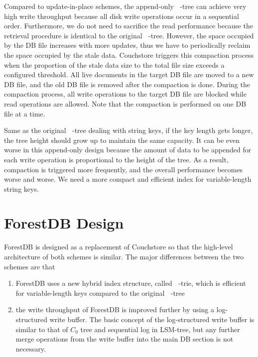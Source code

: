 \documentclass[11pt]{article}
\DeclareMathOperator{\HBP}{\text{HB}^+}
\DeclareMathOperator{\BP}{\text{B}^+}
\begin{document}
Compared to update-in-place schemes, the append-only \(\BP\)-tree can achieve very high write
throughput because all disk write operations occur in a sequential order. Furthermore, we do not need
to sacrifice the read performance because the retrieval procedure is identical to the original
\(\BP\)-tree. However, the space occupied by the DB file increases with more updates, thus we have to
periodically reclaim the space occupied by the stale data. Couchstore triggers this compaction process
when the proportion of the stale data size to the total file size exceeds a configured threshold. All
live documents in the target DB file are moved to a new DB file, and the old DB file is removed after
the compaction is done. During the compaction process, all write operations to the target DB file are
blocked while read operations are allowed. Note that the compaction is performed on one DB file at a
time.

Same as the original \(\BP\)-tree dealing with string keys, if the key length gets longer, the tree
height should grow up to maintain the same capacity. It can be even worse in this append-only design
because the amount of data to be appended for each write operation is proportional to the height of
the tree. As a result, compaction is triggered more frequently, and the overall performance becomes
worse and worse. We need a more compact and efficient index for variable-length string keys.
\section{ForestDB Design}
\label{sec:orgafc492b}
ForestDB is designed as a replacement of Couchstore so that the high-level architecture of both
schemes is similar. The major differences between the two schemes are that
\begin{enumerate}
\item ForestDB uses a new hybrid index structure, called \(\HBP\)-trie, which is efficient for
variable-length keys compared to the original \(\BP\)-tree
\item the write throughput of ForestDB is improved further by using a log-structured write buffer. The
basic concept of the log-structured write buffer is similar to that of \(C_0\) tree and sequential
log in LSM-tree, but any further merge operations from the write buffer into the main DB section is
not necessary.
\end{enumerate}
\end{document}
